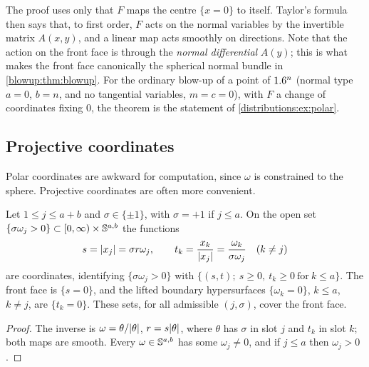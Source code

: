 \begin{discussion}
The proof uses only that $F$ maps the centre $\{x=0\}$ to itself. Taylor's formula then
says that, to first order, $F$ acts on the normal variables by the invertible matrix
$A(x,y)$, and a linear map acts smoothly on directions. Note that the action on the
front face is through the \emph{normal differential} $A(y)$; this is what makes the
front face canonically the spherical normal bundle in \cref{blowup:thm:blowup}. For
the ordinary blow-up of a point of $1.6^n$ (normal type $a=0$, $b=n$, and no tangential
variables, $m=c=0$), with $F$ a change of coordinates fixing $0$, the theorem is the
statement of \cref{distributions:ex:polar}.
\end{discussion}

\subsection{Projective coordinates}
Polar coordinates are awkward for computation, since $\omega$ is constrained to the
sphere. Projective coordinates are often more convenient.

\begin{lemma}\label{blowup:lem:projective}
Let $1\le j\le a+b$ and $\sigma\in\{\pm1\}$, with $\sigma=+1$ if $j\le a$. On the open set
$\{\sigma\omega_j>0\}\subset[0,\infty)\times\mathbb{S}^{a,b}$ the functions
\begin{equation}\label{blowup:eq:projective}
  s=\lvert x_j\rvert=\sigma r\omega_j,\qquad t_k=\frac{x_k}{\lvert x_j\rvert}=\frac{\omega_k}{\sigma\omega_j}
  \quad(k\neq j)
\end{equation}
are coordinates, identifying $\{\sigma\omega_j>0\}$ with
$\{(s,t);\ s\ge0,\ t_k\ge0\ \text{for}\ k\le a\}$. The front face is $\{s=0\}$, and the
lifted boundary hypersurfaces $\{\omega_k=0\}$, $k\le a$, $k\ne j$, are $\{t_k=0\}$. These
sets, for all admissible $(j,\sigma)$, cover the front face.
\end{lemma}
\begin{proof}
The inverse is $\omega=\theta/\lvert \theta\rvert$, $r=s\lvert \theta\rvert$, where $\theta$ has $\sigma$ in
slot $j$ and $t_k$ in slot $k$; both maps are smooth. Every $\omega\in\mathbb{S}^{a,b}$ has
some $\omega_j\ne0$, and if $j\le a$ then $\omega_j>0$.
\end{proof}

